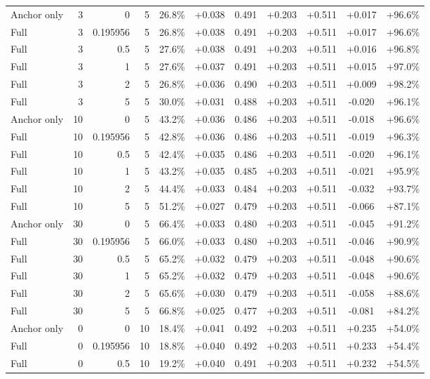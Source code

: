 \begin{table}[htbp]
\begin{tabular}{lrrrccccccc}
Anchor only & 3 & 0 & 5 & 26.8\% & +0.038 & 0.491 & +0.203 & +0.511 & +0.017 & +96.6\% \\
Full & 3 & 0.195956 & 5 & 26.8\% & +0.038 & 0.491 & +0.203 & +0.511 & +0.017 & +96.6\% \\
Full & 3 & 0.5 & 5 & 27.6\% & +0.038 & 0.491 & +0.203 & +0.511 & +0.016 & +96.8\% \\
Full & 3 & 1 & 5 & 27.6\% & +0.037 & 0.491 & +0.203 & +0.511 & +0.015 & +97.0\% \\
Full & 3 & 2 & 5 & 26.8\% & +0.036 & 0.490 & +0.203 & +0.511 & +0.009 & +98.2\% \\
Full & 3 & 5 & 5 & 30.0\% & +0.031 & 0.488 & +0.203 & +0.511 & -0.020 & +96.1\% \\
Anchor only & 10 & 0 & 5 & 43.2\% & +0.036 & 0.486 & +0.203 & +0.511 & -0.018 & +96.6\% \\
Full & 10 & 0.195956 & 5 & 42.8\% & +0.036 & 0.486 & +0.203 & +0.511 & -0.019 & +96.3\% \\
Full & 10 & 0.5 & 5 & 42.4\% & +0.035 & 0.486 & +0.203 & +0.511 & -0.020 & +96.1\% \\
Full & 10 & 1 & 5 & 43.2\% & +0.035 & 0.485 & +0.203 & +0.511 & -0.021 & +95.9\% \\
Full & 10 & 2 & 5 & 44.4\% & +0.033 & 0.484 & +0.203 & +0.511 & -0.032 & +93.7\% \\
Full & 10 & 5 & 5 & 51.2\% & +0.027 & 0.479 & +0.203 & +0.511 & -0.066 & +87.1\% \\
Anchor only & 30 & 0 & 5 & 66.4\% & +0.033 & 0.480 & +0.203 & +0.511 & -0.045 & +91.2\% \\
Full & 30 & 0.195956 & 5 & 66.0\% & +0.033 & 0.480 & +0.203 & +0.511 & -0.046 & +90.9\% \\
Full & 30 & 0.5 & 5 & 65.2\% & +0.032 & 0.479 & +0.203 & +0.511 & -0.048 & +90.6\% \\
Full & 30 & 1 & 5 & 65.2\% & +0.032 & 0.479 & +0.203 & +0.511 & -0.048 & +90.6\% \\
Full & 30 & 2 & 5 & 65.6\% & +0.030 & 0.479 & +0.203 & +0.511 & -0.058 & +88.6\% \\
Full & 30 & 5 & 5 & 66.8\% & +0.025 & 0.477 & +0.203 & +0.511 & -0.081 & +84.2\% \\
Anchor only & 0 & 0 & 10 & 18.4\% & +0.041 & 0.492 & +0.203 & +0.511 & +0.235 & +54.0\% \\
Full & 0 & 0.195956 & 10 & 18.8\% & +0.040 & 0.492 & +0.203 & +0.511 & +0.233 & +54.4\% \\
Full & 0 & 0.5 & 10 & 19.2\% & +0.040 & 0.491 & +0.203 & +0.511 & +0.232 & +54.5\% \\

\end{tabular}
\end{table}
